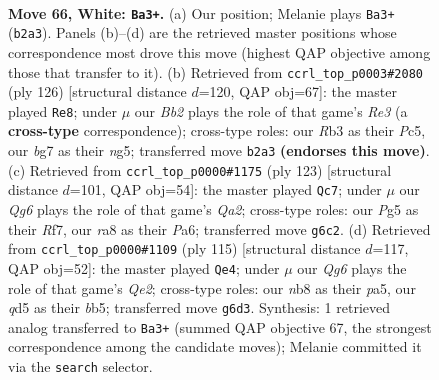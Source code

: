 \documentclass[11pt]{article}
\begin{document}
\clearpage

\begin{figure}[p]\centering
\begin{subfigure}{0.46\textwidth}\centering
\resizebox{\linewidth}{!}{%
\newchessgame
\chessboard[
  setfen={rn3kr1/6b1/6Q1/3q2P1/3P1P1p/1R5P/1B3R1K/8 w - - 0 66},
  showmover=false,
  pgfstyle=straightmove, color=movearrow, markmove={b2-a3}
]}
\caption{}
\end{subfigure}\hfill
\begin{subfigure}{0.46\textwidth}\centering
\resizebox{\linewidth}{!}{%
\newchessgame
\chessboard[
  setfen={5rk1/2b3p1/8/2Pq2nQ/1P6/4R2P/5P2/4RK2 w - - 11 64},
  showmover=false,
  pgfstyle=straightmove, color=movearrow, markmove={e3-e8}
]}
\caption{}
\end{subfigure}
\\[4pt]
\begin{subfigure}{0.46\textwidth}\centering
\resizebox{\linewidth}{!}{%
\newchessgame
\chessboard[
  setfen={8/q4r1k/p1p3p1/P4b1p/1P1Rp3/4Q3/7P/2R3K1 b - - 2 62},
  showmover=false,
  pgfstyle=straightmove, color=movearrow, markmove={a7-c7}
]}
\caption{}
\end{subfigure}\hfill
\begin{subfigure}{0.46\textwidth}\centering
\resizebox{\linewidth}{!}{%
\newchessgame
\chessboard[
  setfen={b4rk1/4qp2/6pQ/PB1p4/2nN3p/7P/6P1/5R1K b - - 7 58},
  showmover=false,
  pgfstyle=straightmove, color=movearrow, markmove={e7-e4}
]}
\caption{}
\end{subfigure}
\caption{\textbf{Move 66, White: \texttt{Ba3+}.} (a) Our position; Melanie plays \texttt{Ba3+} (\texttt{b2a3}). Panels (b)--(d) are the retrieved master positions whose correspondence most drove this move (highest QAP objective among those that transfer to it). (b) Retrieved from \texttt{ccrl\_top\_p0003\#2080} (ply 126) [structural distance $d$=120, QAP obj=67]: the master played \texttt{Re8}; under $\mu$ our \emph{Bb2} plays the role of that game's \emph{Re3} (a \textbf{cross-type} correspondence); cross-type roles: our \emph{R}b3 as their \emph{P}c5, our \emph{b}g7 as their \emph{n}g5; transferred move \texttt{b2a3} \textbf{(endorses this move)}. (c) Retrieved from \texttt{ccrl\_top\_p0000\#1175} (ply 123) [structural distance $d$=101, QAP obj=54]: the master played \texttt{Qc7}; under $\mu$ our \emph{Qg6} plays the role of that game's \emph{Qa2}; cross-type roles: our \emph{P}g5 as their \emph{R}f7, our \emph{r}a8 as their \emph{P}a6; transferred move \texttt{g6c2}. (d) Retrieved from \texttt{ccrl\_top\_p0000\#1109} (ply 115) [structural distance $d$=117, QAP obj=52]: the master played \texttt{Qe4}; under $\mu$ our \emph{Qg6} plays the role of that game's \emph{Qe2}; cross-type roles: our \emph{n}b8 as their \emph{p}a5, our \emph{q}d5 as their \emph{b}b5; transferred move \texttt{g6d3}. Synthesis: 1 retrieved analog transferred to \texttt{Ba3+} (summed QAP objective 67, the strongest correspondence among the candidate moves); Melanie committed it via the \texttt{search} selector.}
\label{fig:thought-m130}
\end{figure}
\end{document}
